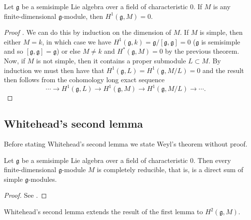 \begin{corollary}
  Let $ \mathfrak{g} $ be a semisimple Lie algebra over a field of characteristic $ 0 $. If $ M $ is any finite-dimensional $ \mathfrak{g} $-module, then $ H^1(\mathfrak{g}, M)=0 $.
\end{corollary}
\begin{proof}[Proof \cite{weibel1994homological}]
  We can do this by induction on the dimension of $ M $. If $ M $ is simple, then either $ M = k $, in which case we have $ H^1(\mathfrak{g}, k) = \mathfrak{g}/[\mathfrak{g}, \mathfrak{g}] = 0 $ ($ \mathfrak{g} $ is semisimple and so $ [\mathfrak{g}, \mathfrak{g}] = \mathfrak{g} $) or else $ M \neq k $ and $ H^{*}(\mathfrak{g}, M)=0 $ by the previous theorem. Now, if $ M $ is not simple, then it contains a proper submodule $ L \subset M $. By induction we must then have that $ H^1(\mathfrak{g}, L) = H^1(\mathfrak{g}, M/L) = 0 $ and the result then follows from the cohomology long exact sequence
  \begin{equation}
    \cdots \to H^1(\mathfrak{g}, L) \to H^1(\mathfrak{g}, M) \to H^1(\mathfrak{g}, M/L) \to \cdots.
  \end{equation}
\end{proof}

\subsection{Whitehead's second lemma} %
\label{sub:Whitehead's second lemma}
Before stating Whitehead's second lemma we state Weyl's theorem without proof.
\begin{theorem}
  Let $ \mathfrak{g} $ be a semisimple Lie algebra over a field of characteristic 0. Then every finite-dimensional $ \mathfrak{g} $-module $ M $ is completely reducible, that is, is a direct sum of simple $ \mathfrak{g} $-modules.
\end{theorem}
\begin{proof}
  See \cite[Section 7]{weibel1994homological}.
\end{proof}

Whitehead's second lemma extends the result of the first lemma to $ H^2(\mathfrak{g}, M) $.

